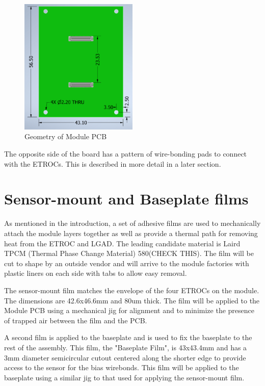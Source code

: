 \documentclass[10pt]{datasheet}
\begin{document}
\begin{figure}[h]
	\centering
	\includegraphics[width=0.5\textwidth,angle=-90]{figures/module_pcb.png}
	\caption{Geometry of Module PCB}
	\label{fig:module-pcb}	
\end{figure}

The opposite side of the board has a pattern of wire-bonding pads to connect with the ETROCs. This is described in more detail in a later section.



\section{Sensor-mount and Baseplate films}

As mentioned in the introduction, a set of adhesive films are used to mechanically attach the module layers together as well as provide a thermal path for removing heat from the ETROC and LGAD. The leading candidate material is Laird TPCM (Thermal Phase Change Material) 580(CHECK THIS). The film will be cut to shape by an outside vendor and will arrive to the module factories with plastic liners on each side with tabs to allow easy removal.

The sensor-mount film matches the envelope of the four ETROCs on the module. The dimensions are 42.6x46.6mm and 80um thick. The film will be applied to the Module PCB using a mechanical jig for alignment and to minimize the presence of trapped air between the film and the PCB.

A second film is applied to the baseplate and is used to fix the baseplate to the rest of the assembly. This film, the "Baseplate Film", is 43x43.4mm and has a 3mm diameter semicircular cutout centered along the shorter edge to provide access to the sensor for the bias wirebonds. This film will be applied to the baseplate using a similar jig to that used for applying the sensor-mount film. 
\end{document}
